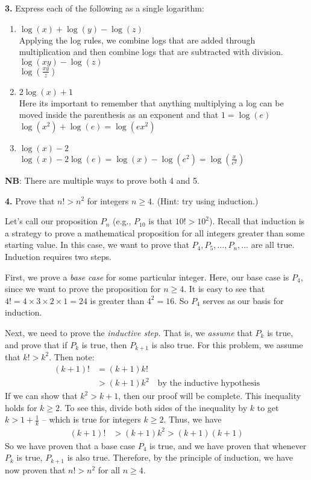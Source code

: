 \documentclass[12pt]{article}
\begin{document}
\bigskip 

\noindent \textbf{3.} Express each of the following as a single logarithm:

\begin{enumerate}
\item $ \log(x) + \log(y) - \log(z)    $\\
Applying the log rules, we combine logs that are added through multiplication and then combine logs that are subtracted with division.\\
$\log(xy) - \log(z)$\\
$\log( \frac{xy}{z})$
\item  $  2\log(x) + 1   $\\
Here its important to remember that anything multiplying a log can be moved inside the parenthesis as an exponent and that $1 = \log(e)$\\
$\log(x^2) + \log(e) = \log(ex^2)$
\item  $  \log(x) - 2  $\\
$\log(x) - 2\log(e) = \log(x) - \log(e^2)  = \log(\frac{x}{e^2})$
\end{enumerate}

\bigskip 


\textbf{NB}: There are multiple ways to prove both 4 and 5.

\bigskip


\textbf{4.}	Prove that $n! > n^2$ for integers $n \ge 4$. (Hint: try using induction.)

Let's call our proposition $P_n$ (e.g., $P_{10}$ is that $10! > 10^2$). Recall that induction is a strategy to prove a mathematical proposition for all integers greater than some starting value. In this case, we want to prove that $P_4, P_5, \dots, P_n, \dots$ are all true. Induction requires two steps. 

First, we prove a \emph{base case} for some particular integer. Here, our base case is $P_4$, since we want to prove the proposition for $n \ge 4$. It is easy to see that $4! = 4 \times 3 \times 2 \times 1 = 24$ is greater than $4^2 = 16$. So $P_4$ serves as our basis for induction. 

Next, we need to prove the \emph{inductive step}. That is, we \textit{assume} that $P_k$ is true, and prove that if $P_k$ is true, then $P_{k+1}$ is also true. For this problem, we assume that $k! > k^2$. Then note:
\begin{align}
(k+1)! &= (k+1) k! \\
&> (k+1)k^2 \quad \text{by the inductive hypothesis}
\end{align}
If we can show that $k^2 > k+1$, then our proof will be complete. This inequality holds for $k \ge 2$. To see this, divide both sides of the inequality by $k$ to get $k > 1 + \frac{1}{k}$ -- which is true for integers $k \ge 2$. Thus, we have
\begin{align}
(k+1)! &> (k+1)k^2 > (k+1)(k+1)
\end{align}
So we have proven that a base case $P_4$ is true, and we have proven that whenever $P_k$ is true, $P_{k+1}$ is also true. Therefore, by the principle of induction, we have now proven that $n! > n^2$ for all $n \ge 4$. 
\end{document}
